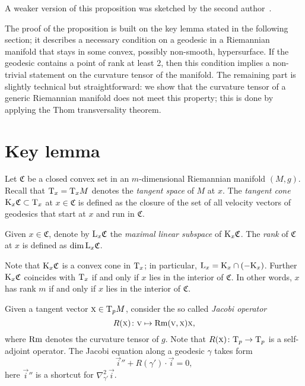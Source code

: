 \documentclass[a4paper,10pt]{article}
\begin{document}
{\color{red} A  weaker version} of this proposition was sketched by the second author~\cite{petrunin-2009}.  

The proof of the proposition is built on the key lemma stated in the following section;   
it describes a necessary condition on a geodesic in a Riemannian manifold that {\color{red} stays}
in some convex, possibly non-smooth, hypersurface.
If the geodesic contains a point of rank at least 2, then this condition implies a non-trivial
statement on the curvature tensor of the manifold.
The remaining part is {\color{red} slightly technical but}  straightforward: we show that the curvature tensor of a generic Riemannian manifold does not meet this property; this is done by applying the Thom transversality theorem.


\section{Key lemma}


Let $\mathfrak{C}$ be a closed convex set in an $m$-dimensional Riemannian manifold $(M,g)$.
Recall that $\mathrm{T}_x=\mathrm{T}_xM$ denotes the \emph{tangent space} of $M$ at $x$.
The \emph{tangent cone} $\mathrm{K}_x\mathfrak{C}\subset \mathrm{T}_x$ at $x\in\mathfrak{C}$ is defined as the closure of the set of all velocity vectors of geodesics that start at $x$ and run in $\mathfrak{C}$.

Given $x\in \mathfrak{C}$, denote by $\mathrm{L}_x\mathfrak{C}$ the \emph{maximal linear subspace} of $\mathrm{K}_x\mathfrak{C}$.
The \emph{rank} of $\mathfrak{C}$ at $x$ is defined as $\operatorname{\rm dim} \mathrm{L}_x\mathfrak{C}$.

Note {\color{red} that} $\mathrm{K}_x\mathfrak{C}$ is a convex cone in $\mathrm{T}_x$; in particular, $\mathrm{L}_x=\mathrm{K}_x\cap (-\mathrm{K}_x)$.
Further $\mathrm{K}_x\mathfrak{C}$ coincides with 
$\mathrm{T}_x$ if and only if
$x$ lies in the interior of $\mathfrak{C}$.
In other words, $x$ has rank $m$ if and only if $x$ lies in the interior of $\mathfrak{C}$.%


Given a tangent vector $\text{\sc{x}}\in\mathrm{T}_pM$, consider the so called \emph{Jacobi operator}
\[R(\text{\sc{x}})\colon\text{\sc{v}}\mapsto \operatorname{\rm Rm}(\text{\sc{v}},\text{\sc{x}})\text{\sc{x}},\]
where $\operatorname{\rm Rm}$ denotes the curvature tensor of $g$.
Note that $R(\text{\sc{x}})\colon\mathrm{T}_p\to \mathrm{T}_p$ is a self-adjoint operator.
{\color{red} The} Jacobi equation along a geodesic $\gamma$ takes form 
\[\vec{i}''+R(\gamma')\cdot \vec{i}=0,\]
here $\vec{i}''$ is a shortcut for $\nabla^2_{\gamma'}\vec{i}$.
\end{document}
